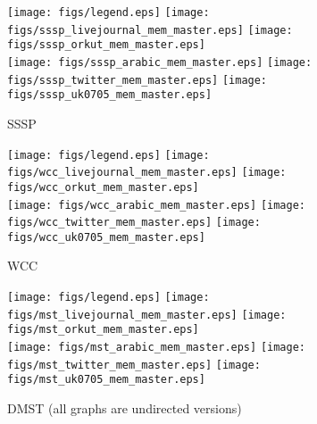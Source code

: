 \documentclass{article}
\newcommand{\bline}[1][1]{\vspace{#1\baselineskip}}
\begin{document}
\begin{figure}[!h]
  \bline[3.5]
  \centering
  \texttt{[image: figs/legend.eps]}\hspace{3em}%
  \texttt{[image: figs/sssp\_livejournal\_mem\_master.eps]}\hspace{1em}%
  \texttt{[image: figs/sssp\_orkut\_mem\_master.eps]}\\
  \texttt{[image: figs/sssp\_arabic\_mem\_master.eps]}\hspace{1em}%
  \texttt{[image: figs/sssp\_twitter\_mem\_master.eps]}\hspace{1em}%
  \texttt{[image: figs/sssp\_uk0705\_mem\_master.eps]}
  \caption{SSSP}
\end{figure}

\begin{figure}[!h]
  \bline[3.5]
  \centering
  \texttt{[image: figs/legend.eps]}\hspace{3em}%
  \texttt{[image: figs/wcc\_livejournal\_mem\_master.eps]}\hspace{1em}%
  \texttt{[image: figs/wcc\_orkut\_mem\_master.eps]}\\
  \texttt{[image: figs/wcc\_arabic\_mem\_master.eps]}\hspace{1em}%
  \texttt{[image: figs/wcc\_twitter\_mem\_master.eps]}\hspace{1em}%
  \texttt{[image: figs/wcc\_uk0705\_mem\_master.eps]}
  \caption{WCC}
\end{figure}

\begin{figure}[!h]
  \bline[3.5]
  \centering
  \texttt{[image: figs/legend.eps]}\hspace{3em}%
  \texttt{[image: figs/mst\_livejournal\_mem\_master.eps]}\hspace{1em}%
  \texttt{[image: figs/mst\_orkut\_mem\_master.eps]}\\
  \texttt{[image: figs/mst\_arabic\_mem\_master.eps]}\hspace{1em}%
  \texttt{[image: figs/mst\_twitter\_mem\_master.eps]}\hspace{1em}%
  \texttt{[image: figs/mst\_uk0705\_mem\_master.eps]}
  \caption{DMST (all graphs are undirected versions)}
\end{figure}
\end{document}
